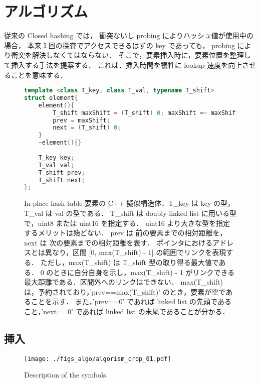 \chapter{アルゴリズム}
\label{chap_Algorism}

従来の Closed hashing では，
衝突ないし probing によりハッシュ値が使用中の場合，
本来１回の探査でアクセスできるはずの key であっても，
probing により衝突を解決しなくてはならない．
そこで，要素挿入時に，要素位置を整理して挿入する手法を提案する．
これは．挿入時間を犠牲に lookup 速度を向上させることを意味する．

\begin{figure}[h] %
\begin{lstlisting}[language=C++]
template <class T_key, class T_val, typename T_shift>
struct element{
	element(){
		T_shift maxShift = (T_shift) 0; maxShift =~ maxShift;
		prev = maxShift;
		next = (T_shift) 0;
	}
	~element(){}
	
	T_key key;
	T_val val;
	T_shift prev;
	T_shift next;
};
\end{lstlisting}
\caption{
  In-place hash table 要素の C++ 擬似構造体．T\_key は key の型，T\_val は val の型である．
  T\_shift は doubly-linked list に用いる型で，uint8 または uint16 を指定する．
  uint16 より大きな型を指定するメリットは殆どない．
  prev は 前の要素までの相対距離を，next は 次の要素までの相対距離を表す．
  ポインタにおけるアドレスとは異なり，区間 [0, max(T\_shift) - 1] の範囲でリンクを表現する．
  ただし，max(T\_shift) は T\_shift 型の取り得る最大値である．
  0 のときに自分自身を示し，max(T\_shift) - 1 がリンクできる最大距離である．区間外へのリンクはできない．
  max(T\_shift) は，予約されており，'prev==max(T\_shift)' のとき，要素が空であることを示す．
  また，'prev==0' であれば linked list の先頭であること，'next==0' であれば linked list の末尾であることが分かる．
}
\label{fig_IpCHashT_struct}
\end{figure}



\section{挿入}

\begin{figure}[h]
  \vspace{-0.5cm}
  \texttt{[image: ./figs\_algo/algorism\_crop\_01.pdf]}
  \caption{
    Description of the symbols.
  }
  \label{fig_IpCHashT_fig_description}
  \vspace{-0.5cm}
\end{figure}

